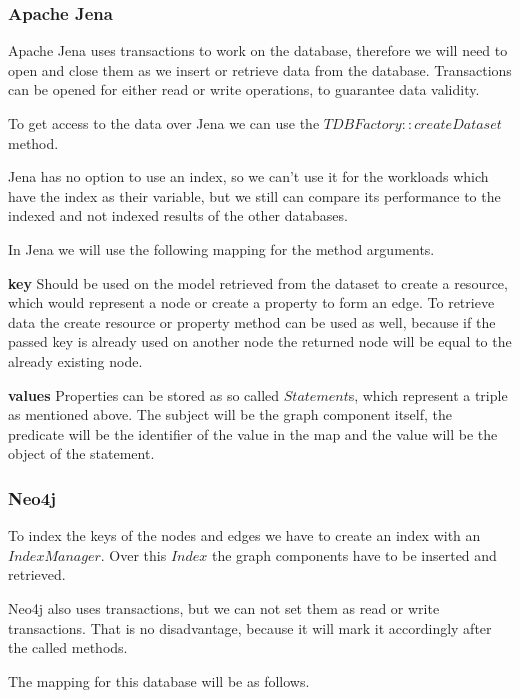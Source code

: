 
\subsubsection{Apache Jena}
Apache Jena uses transactions to work on the database,
therefore we will need to open and close them as we insert or retrieve data from the database.
Transactions can be opened for either read or write operations,
to guarantee data validity.

To get access to the data over Jena we can use the $ TDBFactory::createDataset $ method.

Jena has no option to use an index,
so we can't use it for the workloads which have the index as their variable,
but we still can compare its performance to the indexed and not indexed results of the other databases.

In Jena we will use the following mapping for the method arguments.

\textbf{key} \newline
Should be used on the model retrieved from the dataset to create a resource,
which would represent a node or create a property to form an edge.
To retrieve data the create resource or property method can be used as well,
because if the passed key is already used on another node the returned node will be equal to the already existing node.

\textbf{values} \newline
Properties can be stored as so called $ Statement $s,
which represent a triple as mentioned above.
The subject will be the graph component itself,
the predicate will be the identifier of the value in the map and the value will be the object of the statement.

\subsubsection{Neo4j}
To index the keys of the nodes and edges we have to create an index with an $ Index Manager $.
Over this $ Index $ the graph components have to be inserted and retrieved.

Neo4j also uses transactions,
but we can not set them as read or write transactions.
That is no disadvantage,
because it will mark it accordingly after the called methods.

The mapping for this database will be as follows.

